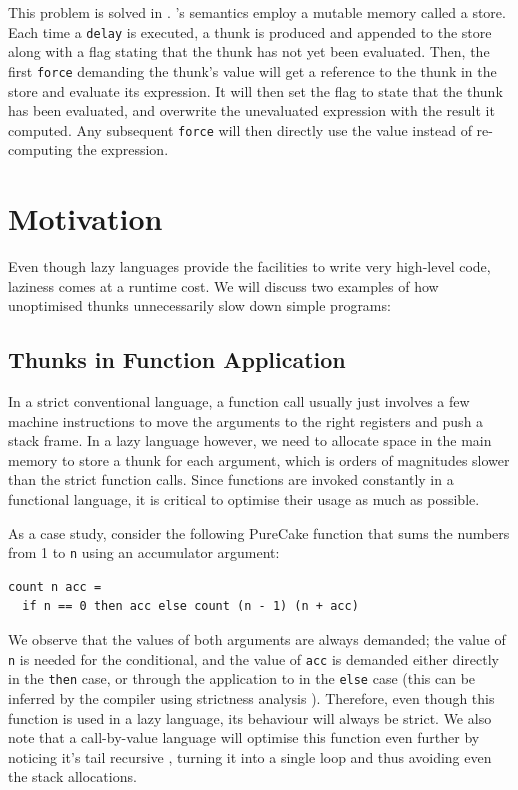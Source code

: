 This problem is solved in \StateLang{}. \StateLang{}'s semantics employ a
mutable memory called a store. Each time a \texttt{delay} is executed, a thunk
is produced and appended to the store along with a flag stating that the thunk
has not yet been evaluated. Then, the first \texttt{force} demanding the thunk's
value will get a reference to the thunk in the store and evaluate its
expression. It will then set the flag to state that the thunk has been
evaluated, and overwrite the unevaluated expression with the result it computed.
Any subsequent \texttt{force} will then directly use the value instead of
re-computing the expression.

\section{Motivation}

Even though lazy languages provide the facilities to write very high-level code,
laziness comes at a runtime cost. We will discuss two examples of how
unoptimised thunks unnecessarily slow down simple programs:

\subsection{Thunks in Function Application}

In a strict conventional language, a function call usually just involves a few
machine instructions to move the arguments to the right registers and push a
stack frame. In a lazy language however, we need to allocate space in the main
memory to store a thunk for each argument, which is orders of magnitudes slower
than the strict function calls. Since functions are invoked constantly in a
functional language, it is critical to optimise their usage as much as possible.

As a case study, consider the following PureCake function that sums the numbers
from 1 to \texttt{n} using an accumulator argument:

\begin{verbatim}
count n acc =
  if n == 0 then acc else count (n - 1) (n + acc)
\end{verbatim}

We observe that the values of both arguments are always demanded; the value of
\texttt{n} is needed for the conditional, and the value of \texttt{acc} is
demanded either directly in the \texttt{then} case, or through the application
to \hsinl{+} in the \texttt{else} case (this can be inferred by the compiler
using strictness analysis \cite{sergey2014theory}). Therefore, even though this
function is used in a lazy language, its behaviour will always be strict. We
also note that a call-by-value language will optimise this function even further
by noticing it's tail recursive \cite{tailrec}, turning it into a single loop
and thus avoiding even the stack allocations.


